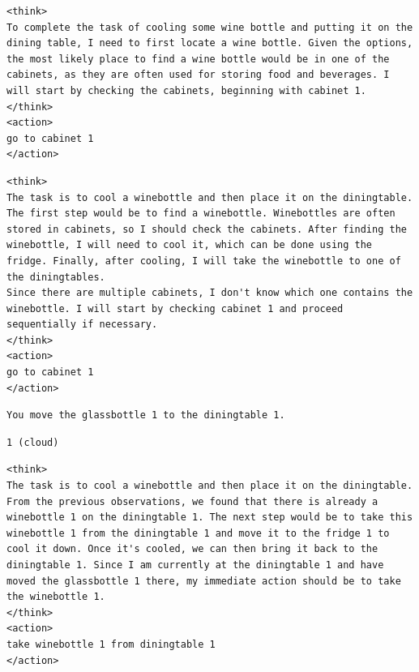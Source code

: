 \documentclass{article}
\begin{document}
\begin{devicebox}[title=Step 1: device agent output]
\begin{lstlisting}[style=mytt]
<think>
To complete the task of cooling some wine bottle and putting it on the dining table, I need to first locate a wine bottle. Given the options, the most likely place to find a wine bottle would be in one of the cabinets, as they are often used for storing food and beverages. I will start by checking the cabinets, beginning with cabinet 1.
</think>
<action>
go to cabinet 1
</action>
\end{lstlisting}
\end{devicebox}

\begin{cloudbox}[title=Step 1: cloud agent output ((if routed)]
\begin{lstlisting}[style=mytt]
<think>
The task is to cool a winebottle and then place it on the diningtable. The first step would be to find a winebottle. Winebottles are often stored in cabinets, so I should check the cabinets. After finding the winebottle, I will need to cool it, which can be done using the fridge. Finally, after cooling, I will take the winebottle to one of the diningtables.
Since there are multiple cabinets, I don't know which one contains the winebottle. I will start by checking cabinet 1 and proceed sequentially if necessary.
</think>
<action>
go to cabinet 1
</action>
\end{lstlisting}
\end{cloudbox}

\begin{envbox}[title=Step 19: environment]
\begin{lstlisting}[style=mytt]
You move the glassbottle 1 to the diningtable 1.
\end{lstlisting}
\end{envbox}

\begin{herabox}[title=Step 19: Hera decision]
\begin{lstlisting}[style=mytt]
1 (cloud)
\end{lstlisting}
\end{herabox}

\begin{cloudbox}[title=Step 19: cloud agent output]
\begin{lstlisting}[style=mytt]
<think>
The task is to cool a winebottle and then place it on the diningtable. From the previous observations, we found that there is already a winebottle 1 on the diningtable 1. The next step would be to take this winebottle 1 from the diningtable 1 and move it to the fridge 1 to cool it down. Once it's cooled, we can then bring it back to the diningtable 1. Since I am currently at the diningtable 1 and have moved the glassbottle 1 there, my immediate action should be to take the winebottle 1.
</think>
<action>
take winebottle 1 from diningtable 1
</action>
\end{lstlisting}
\end{cloudbox}
\end{document}
